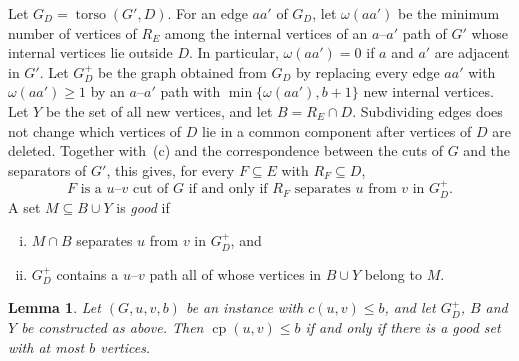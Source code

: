 \documentclass[a4paper,fleqn]{cas-sc}
\numberwithin{equation}{section}
\theoremstyle{definition}
\theoremstyle{plain}
\newtheorem{lemma}[definition]{Lemma}
\theoremstyle{remark}
\newcommand{\cp}{\operatorname{cp}}                  %
\newcommand{\torso}{\operatorname{torso}}
\begin{document}
Let $G_D = \torso(G', D)$.
For an edge $aa'$ of $G_D$, let $\omega(aa')$ be the minimum number of vertices of $R_E$ among the internal vertices of an $a$--$a'$ path of $G'$ whose internal vertices lie outside $D$.
In particular, $\omega(aa') = 0$ if $a$ and $a'$ are adjacent in $G'$.
Let $G_D^+$ be the graph obtained from $G_D$ by replacing every edge $aa'$ with $\omega(aa') \geq 1$ by an $a$--$a'$ path with $\min\{\omega(aa'), b+1\}$ new internal vertices.
Let $Y$ be the set of all new vertices, and let $B = R_E \cap D$.
Subdividing edges does not change which vertices of $D$ lie in a common component after vertices of $D$ are deleted.
Together with~(c) and the correspondence between the cuts of $G$ and the separators of $G'$, this gives, for every $F \subseteq E$ with $R_F \subseteq D$,
\begin{equation}
\label{eq:cut-separator}
\text{$F$ is a $u$--$v$ cut of $G$ if and only if $R_F$ separates $u$ from $v$ in $G_D^+$.}
\end{equation}
A set $M \subseteq B \cup Y$ is \emph{good} if
\begin{enumerate}[(i)]
    \item $M \cap B$ separates $u$ from $v$ in $G_D^+$, and
    \item $G_D^+$ contains a $u$--$v$ path all of whose vertices in $B \cup Y$ belong to $M$.
\end{enumerate}

\begin{lemma}
\label{lem:good-set}
Let $(G, u, v, b)$ be an instance with $c(u,v) \leq b$, and let $G_D^+$, $B$ and $Y$ be constructed as above.
Then $\cp(u,v) \leq b$ if and only if there is a good set with at most $b$ vertices.
\end{lemma}
\end{document}
